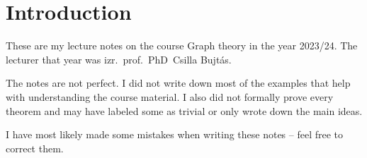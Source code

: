 \section*{Introduction}

These are my lecture notes on the course Graph theory in the
year 2023/24. The lecturer that year was izr.~prof.~PhD~Csilla
Bujtás.

The notes are not perfect. I did not write down most of the examples
that help with understanding the course material. I also did not
formally prove every theorem and may have labeled some as trivial or
only wrote down the main ideas.

I have most likely made some mistakes when writing these notes --
feel free to correct them.
